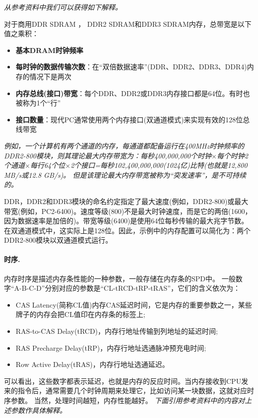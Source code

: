 \documentclass[final]{cvpr}
\newcommand{\mypara}[1]{\paragraph{#1.}}
\begin{document}
\textit{从参考资料\cite{Web/wiki-mb}中我们可以获得如下解释。}

对于商用DDR SDRAM ， DDR2 SDRAM和DDR3 SDRAM内存，总带宽是以下值之乘积：
\begin{itemize}
    \item \textbf{基本DRAM时钟频率}
    \item \textbf{每时钟的数据传输次数}：在“双倍数据速率”(DDR、DDR2、DDR3、DDR4)内存的情况下是两次
    \item \textbf{内存总线(接口)带宽}：每个DDR、DDR2或DDR3内存接口都是64位。有时也被称为1个“行”
    \item \textbf{接口数量}：现代PC通常使用两个内存接口(双通道模式)来实现有效的128位总线带宽
\end{itemize}

\textit{例如，一个计算机有两个通道的内存，每通道都配备运行在400MHz时钟频率的DDR2-800模块，则其理论最大内存带宽为：每秒400,000,000个时钟$\times$每个时钟2个通道$\times$每行64个位$\times$2个接口=每秒102,400,000,000(1024亿)比特(也就是12,800 MB/s或12.8 GB/s)。
但是该理论最大内存带宽被称为“突发速率”，是不可持续的。}

DDR，DDR2和DDR3模块的命名约定指定了最大速度(例如，DDR2-800)或最大带宽(例如，PC2-6400)。速度等级(800)不是最大时钟速度，而是它的两倍(1600，因为数据速率是加倍的)。带宽等级(6400)是使用64位每秒传输的最大兆字节数。在双通道模式中，这实际上是128位。因此，示例中的内存配置可以简化为：两个DDR2-800模块以双通道模式运行。


\mypara{时序}

内存时序是描述内存条性能的一种参数，一般存储在内存条的SPD中。
一般数字“A-B-C-D”分别对应的参数是“CL-tRCD-tRP-tRAS”，它们的含义依次为：
\begin{itemize}
    \item CAS Latency(简称CL值)内存CAS延迟时间，它是内存的重要参数之一，某些牌子的内存会把CL值印在内存条的标签上;
    \item RAS-to-CAS Delay(tRCD)，内存行地址传输到列地址的延迟时间;
    \item RAS Precharge Delay(tRP)，内存行地址选通脉冲预充电时间;
    \item Row Active Delay(tRAS)，内存行地址选通延迟。\cite{Web/crucial}
\end{itemize}

可以看出，这些数字都表示延迟，也就是内存的反应时间。当内存接收到CPU发来的指令后，通常需要几个时钟周期来处理它，比如访问某一块数据，这就对应时序参数。
当然，处理时间越短，内存性能越好。
\textit{下面引用参考资料\cite{Web/zhihu2}中的内容对上述参数作具体解释。}
\end{document}
